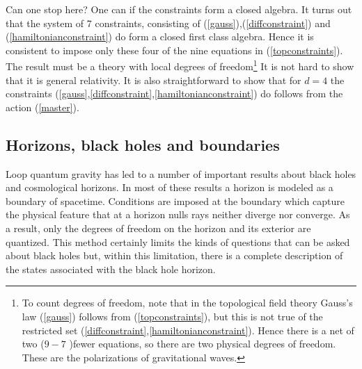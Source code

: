 \documentclass[12pt]{article}
\begin{document}
Can one stop here? One can if the constraints form a closed algebra. It turns out
that the system of 7 constraints, consisting of (\ref{gauss}),(\ref{diffconstraint})
and (\ref{hamiltonianconstraint}) do form a closed first class algebra.  
Hence it is consistent to impose only these four of the
nine equations in (\ref{topconstraints}). The result must be a theory with local
degrees of freedom\footnote{To count degrees of freedom, note that in the topological
field theory Gauss's law (\ref{gauss}) follows from (\ref{topconstraints}), but this
is not true of the restricted set (\ref{diffconstraint},\ref{hamiltonianconstraint}). Hence
there is a net of two ($9-7$ )fewer equations, so there are two physical degrees 
of freedom. These are the polarizations of gravitational waves.}
It is not hard to show that it is general relativity.  It is also straightforward
to show that for $d=4$   the 
constraints (\ref{gauss},\ref{diffconstraint},\ref{hamiltonianconstraint}) do follows
from the action (\ref{master}).  

\subsection{Horizons, black holes and boundaries}

Loop quantum gravity has led to a number of important results about black holes
and cosmological horizons.  In most of these results  a horizon is modeled
as a boundary of spacetime.  Conditions are imposed at the 
boundary which capture the physical
feature that at a horizon nulls rays neither diverge nor converge. 
As a result, only the degrees of freedom on the horizon and its exterior are
quantized.  This method certainly limits the kinds of questions that can be asked
about black holes but, within this limitation, there is a complete description of the
states associated with the black hole horizon.  
\end{document}
